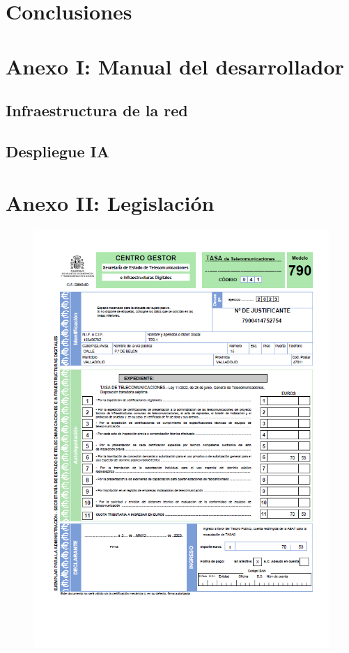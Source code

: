 \documentclass[10pt,a4paper,titlepage]{report}
\begin{document}
\chapter{Conclusiones}
	
	
\chapter*{Anexo I: Manual del desarrollador}
	\section{Infraestructura de la red}
		
	
	\section{Despliegue IA}
		
		
\chapter*{Anexo II: Legislación}
  	\begin{figure}[H]
	\centering
	\includegraphics[width=\textwidth]{Text/Anexos/Legislacion/solicitud.png}
	\label{solicitud}
	\end{figure}
	
	
	
		
\end{document}
